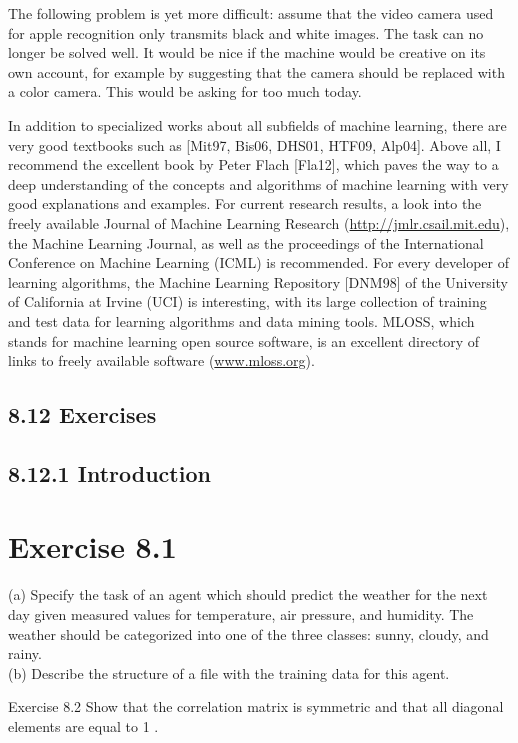 \documentclass[10pt]{article}
\begin{document}
The following problem is yet more difficult: assume that the video camera used for apple recognition only transmits black and white images. The task can no longer be solved well. It would be nice if the machine would be creative on its own account, for example by suggesting that the camera should be replaced with a color camera. This would be asking for too much today.

In addition to specialized works about all subfields of machine learning, there are very good textbooks such as [Mit97, Bis06, DHS01, HTF09, Alp04]. Above all, I recommend the excellent book by Peter Flach [Fla12], which paves the way to a deep understanding of the concepts and algorithms of machine learning with very good explanations and examples. For current research results, a look into the freely available Journal of Machine Learning Research (\href{http://jmlr.csail.mit.edu}{http://jmlr.csail.mit.edu}), the Machine Learning Journal, as well as the proceedings of the International Conference on Machine Learning (ICML) is recommended. For every developer of learning algorithms, the Machine Learning Repository [DNM98] of the University of California at Irvine (UCI) is interesting, with its large collection of training and test data for learning algorithms and data mining tools. MLOSS, which stands for machine learning open source software, is an excellent directory of links to freely available software (\href{http://www.mloss.org}{www.mloss.org}).

\subsection*{8.12 Exercises}
\subsection*{8.12.1 Introduction}
\section*{Exercise 8.1}
(a) Specify the task of an agent which should predict the weather for the next day given measured values for temperature, air pressure, and humidity. The weather should be categorized into one of the three classes: sunny, cloudy, and rainy.\\
(b) Describe the structure of a file with the training data for this agent.

Exercise 8.2 Show that the correlation matrix is symmetric and that all diagonal elements are equal to 1 .
\end{document}
